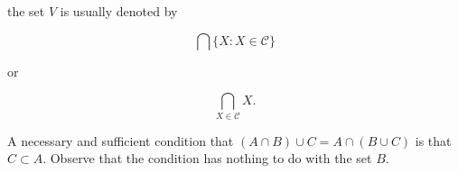 the set $V$ is usually denoted by 

\begin{equation*}
\bigcap \{ X : X \in \mathcal{C} \}
\end{equation*}

or

\begin{equation*}
\bigcap_{X \in \mathcal{C}} X.
\end{equation*}

\begin{exercise}  A necessary and sufficient condition that $(A \cap B) \cup C = A \cap (B \cup C)$ is that $C \subset A$. Observe that the condition has nothing to do with the set $B$.
\end{exercise}
